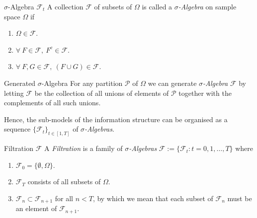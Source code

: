 \documentclass[11pt,a4paper]{article}
\begin{document}
  \begin{definition}{$\sigma$-Algebra $\mathcal{F}_t$}
    A collection $\mathcal{F}$ of subsets of $\Omega$ is called a \textit{$\sigma$-Algebra} on sample space $\Omega$ if
    \begin{enumerate}
      \item $\Omega\in\mathcal{F}$.
      \item $\forall\ F\in\mathcal{F},\ F^c\in\mathcal{F}$.
      \item $\forall\ F,G\in\mathcal{F},\ (F\cup G)\in\mathcal{F}$.
    \end{enumerate}
  \end{definition}

  \begin{proposition}{Generated $\sigma$-Algebra}
    For any partition $\mathcal{P}$ of $\Omega$ we can generate \textit{$\sigma$-Algebra} $\mathcal{F}$ by letting $\mathcal{F}$ be the collection of all unions of elements of $\mathcal{P}$ together with the complements of all such unions.
    \par Hence, the sub-models of the information structure can be organised as a sequence $\{\mathcal{F}_t\}_{t\in[1,T]}$ of \textit{$\sigma$-Algebras}.
  \end{proposition}

  \begin{definition}{Filtration $\mathcal{F}$}
    A \textit{Filtration} is a family of \textit{$\sigma$-Algebras} $\mathcal{F}:=\{\mathcal{F}_t:t=0,1,\dots,T\}$ where
    \begin{enumerate}
      \item $\mathcal{F}_0=\{\emptyset,\Omega\}$.
      \item $\mathcal{F}_T$ consists of all subsets of $\Omega$.
      \item $\mathcal{F}_n\subset\mathcal{F}_{n+1}$ for all $n<T$, by which we mean that each subset of $\mathcal{F}_n$ must be an element of $\mathcal{F}_{n+1}$.
    \end{enumerate}
  \end{definition}
\end{document}
